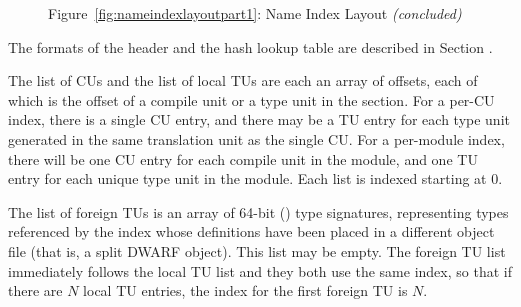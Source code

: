 \begin{figure}[t]
\begin{center}

\vspace{5mm}
Figure~\ref{fig:nameindexlayoutpart1}: Name Index Layout \textit{(concluded)}
\end{center}
\end{figure}

The formats of the header and the hash lookup table are described
in Section .

The list of CUs and the list of local TUs are each an array of
offsets, each of which is the offset of a compile unit or a type unit
in the \dotdebuginfo{} section. For a per-CU index, there is a single CU
entry, and there may be a TU entry for each type unit generated in the
same translation unit as the single CU. For a per-module index, there
will be one CU entry for each compile unit in the module, and one TU
entry for each unique type unit in the module. Each list is indexed
starting at 0.

The list of foreign TUs is an array of 64-bit (\DWFORMrefsigeight) type
signatures, representing types referenced by the index whose
definitions have been placed in a different object file (that is, a split
DWARF object). This list may be empty. 
The foreign TU list immediately follows the local TU list 
and they both use the same index, so that if there are $N$ local TU entries, 
the index for the first foreign TU is $N$.

